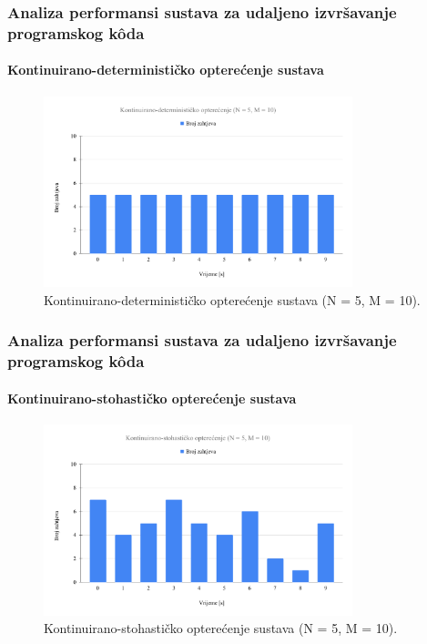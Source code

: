 \documentclass{beamer}
\newif\ifplacelogo
\begin{document}
\placelogofalse
\begin{frame}
\frametitle{Analiza performansi sustava za udaljeno izvršavanje programskog kôda}
\framesubtitle{Kontinuirano-determinističko opterećenje sustava}
\begin{figure}[htb]
	\centering
	\includegraphics[width=0.8\textwidth]{images/Kontinuirano-deterministicko opterecenje (N = 5, M = 10).pdf}
	\caption{
		Kontinuirano-determinističko opterećenje sustava (N = 5, M = 10).
	}
\end{figure}
\end{frame}
\placelogotrue

\placelogofalse
\begin{frame}
\frametitle{Analiza performansi sustava za udaljeno izvršavanje programskog kôda}
\framesubtitle{Kontinuirano-stohastičko opterećenje sustava}
\begin{figure}[htb]
	\centering
	\includegraphics[width=0.8\textwidth]{images/Kontinuirano-stohasticko opterecenje (N = 5, M = 10).pdf}
	\caption{
		Kontinuirano-stohastičko opterećenje sustava (N = 5, M = 10).
	}
\end{figure}
\end{frame}
\placelogotrue
\end{document}
